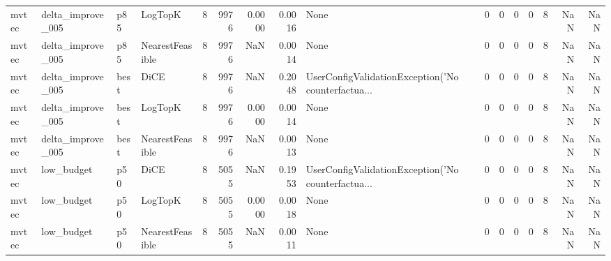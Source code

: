 \begin{tabular}{llllrrrrlrrrrrrr}
  mvtec &    delta\_improve\_005 &    p85 &         LogTopK &            8 &                 9976 &                   0.0000 &      0.0016 &                                               None &      0 &            0 &        0 &              0 &          8 &                NaN &            NaN \\
  mvtec &    delta\_improve\_005 &    p85 & NearestFeasible &            8 &                 9976 &                      NaN &      0.0014 &                                               None &      0 &            0 &        0 &              0 &          8 &                NaN &            NaN \\
  mvtec &    delta\_improve\_005 &   best &            DiCE &            8 &                 9976 &                      NaN &      0.2048 & UserConfigValidationException('No counterfactua... &      0 &            0 &        0 &              0 &          8 &                NaN &            NaN \\
  mvtec &    delta\_improve\_005 &   best &         LogTopK &            8 &                 9976 &                   0.0000 &      0.0014 &                                               None &      0 &            0 &        0 &              0 &          8 &                NaN &            NaN \\
  mvtec &    delta\_improve\_005 &   best & NearestFeasible &            8 &                 9976 &                      NaN &      0.0013 &                                               None &      0 &            0 &        0 &              0 &          8 &                NaN &            NaN \\
  mvtec &           low\_budget &    p50 &            DiCE &            8 &                 5055 &                      NaN &      0.1953 & UserConfigValidationException('No counterfactua... &      0 &            0 &        0 &              0 &          8 &                NaN &            NaN \\
  mvtec &           low\_budget &    p50 &         LogTopK &            8 &                 5055 &                   0.0000 &      0.0018 &                                               None &      0 &            0 &        0 &              0 &          8 &                NaN &            NaN \\
  mvtec &           low\_budget &    p50 & NearestFeasible &            8 &                 5055 &                      NaN &      0.0011 &                                               None &      0 &            0 &        0 &              0 &          8 &                NaN &            NaN \\

\end{tabular}

